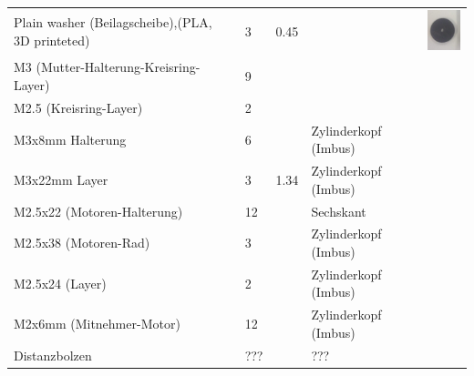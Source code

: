 \documentclass[twoside,colorback,accentcolor=tud4c,11pt]{tudreport}
\begin{document}
\begin{tabular}{l l l l l}
	Plain washer (Beilagscheibe),(PLA, 3D printeted)&3&0.45 & &
	\includegraphics[height=0.06\textwidth]{img/beilagscheibe.png}  \\
	
	M3  (Mutter-Halterung-Kreisring-Layer)&9& & & \\
	M2.5  (Kreisring-Layer)&2& & & \\
	M3x8mm Halterung &6& &Zylinderkopf (Imbus) & \\
	M3x22mm Layer&3&1.34 &Zylinderkopf (Imbus) & \\
	M2.5x22 (Motoren-Halterung) &12&&Sechskant & \\
	M2.5x38 (Motoren-Rad)&3& &Zylinderkopf (Imbus) & \\
	M2.5x24 (Layer)&2& &Zylinderkopf (Imbus) & \\
	M2x6mm  (Mitnehmer-Motor)&12 & &Zylinderkopf (Imbus) & \\
	Distanzbolzen&???& &???& \\
	
\end{tabular}
\end{document}
